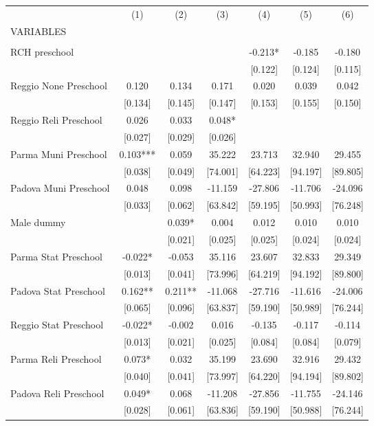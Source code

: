 \begin{tabular}{lcccccc} \hline
 & (1) & (2) & (3) & (4) & (5) & (6) \\
VARIABLES &  &  &  &  &  &  \\ \hline
 &  &  &  &  &  &  \\
RCH preschool &  &  &  & -0.213* & -0.185 & -0.180 \\
 &  &  &  & [0.122] & [0.124] & [0.115] \\
Reggio None Preschool & 0.120 & 0.134 & 0.171 & 0.020 & 0.039 & 0.042 \\
 & [0.134] & [0.145] & [0.147] & [0.153] & [0.155] & [0.150] \\
Reggio Reli Preschool & 0.026 & 0.033 & 0.048* &  &  &  \\
 & [0.027] & [0.029] & [0.026] &  &  &  \\
Parma Muni Preschool & 0.103*** & 0.059 & 35.222 & 23.713 & 32.940 & 29.455 \\
 & [0.038] & [0.049] & [74.001] & [64.223] & [94.197] & [89.805] \\
Padova Muni Preschool & 0.048 & 0.098 & -11.159 & -27.806 & -11.706 & -24.096 \\
 & [0.033] & [0.062] & [63.842] & [59.195] & [50.993] & [76.248] \\
Male dummy &  & 0.039* & 0.004 & 0.012 & 0.010 & 0.010 \\
 &  & [0.021] & [0.025] & [0.025] & [0.024] & [0.024] \\
Parma Stat Preschool & -0.022* & -0.053 & 35.116 & 23.607 & 32.833 & 29.349 \\
 & [0.013] & [0.041] & [73.996] & [64.219] & [94.192] & [89.800] \\
Padova Stat Preschool & 0.162** & 0.211** & -11.068 & -27.716 & -11.616 & -24.006 \\
 & [0.065] & [0.096] & [63.837] & [59.190] & [50.989] & [76.244] \\
Reggio Stat Preschool & -0.022* & -0.002 & 0.016 & -0.135 & -0.117 & -0.114 \\
 & [0.013] & [0.021] & [0.025] & [0.084] & [0.084] & [0.079] \\
Parma Reli Preschool & 0.073* & 0.032 & 35.199 & 23.690 & 32.916 & 29.432 \\
 & [0.040] & [0.041] & [73.997] & [64.220] & [94.194] & [89.802] \\
Padova Reli Preschool & 0.049* & 0.068 & -11.208 & -27.856 & -11.755 & -24.146 \\
 & [0.028] & [0.061] & [63.836] & [59.190] & [50.988] & [76.244] \\

\end{tabular}
